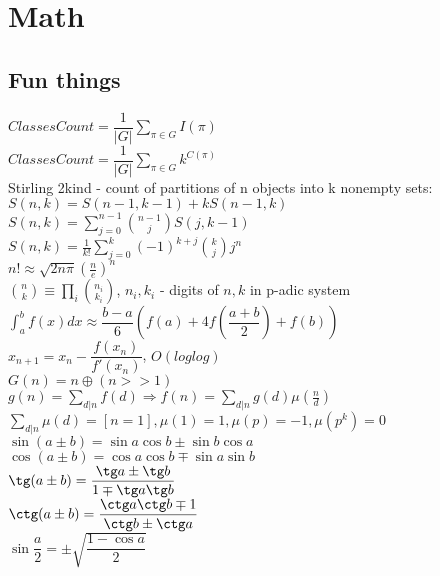 \chapter{Math}

{}
{}
{}
\columnbreak
\section{Fun things}
$ClassesCount = \dfrac{1}{|G|} \sum_{\pi \in G} I(\pi)$\\
$ClassesCount = \dfrac{1}{|G|} \sum_{\pi \in G} k^{C(\pi)}$\\
Stirling 2kind - count of partitions of n objects into k nonempty sets:\\
$S(n,k) = S(n-1,k-1) + kS(n-1,k)$\\
$S(n,k) = \sum_{j=0}^{n-1} \binom{n-1}{j}S(j,k-1)$\\
$S(n,k) = \frac{1}{k!}\sum_{j=0}^k(-1)^{k+j}\binom{k}{j}j^n$\\
$n! \approx \sqrt{2n\pi}(\frac{n}{e})^n$\\
$\binom{n}{k} \equiv \prod_{i}\binom{n_i}{k_i}$, $n_i, k_i$ - digits of $n,k$ in p-adic system
$\int_{a}^{b}f(x)dx \approx \dfrac{b-a}{6}(f(a) + 4f(\dfrac{a+b}
{2})+f(b))$\\
$x_{n+1} = x_n - \dfrac{f(x_n)}{f'(x_n)}$, $O(loglog)$\\
$G(n) = n \oplus (n >> 1)$\\
$g(n) = \sum_{d|n} f(d) \Rightarrow f(n) = \sum_{d|n} g(d) \mu(\frac{n}{d})$\\
$\sum_{d|n} \mu(d) = [n = 1],   \mu(1) = 1, \mu(p) = -1, \mu(p^k) = 0$\\
$\sin(a \pm b) = \sin a \cos b \pm \sin b \cos a$\\
$\cos(a \pm b) = \cos a \cos b \mp \sin a \sin b$\\
$\tg(a\pm b) = \dfrac{\tg a \pm \tg b}{1 \mp \tg a \tg b}$\\
$\ctg(a \pm b) = \dfrac{\ctg a \ctg b \mp 1}{\ctg b \pm \ctg a}$\\
$\sin \dfrac{a}{2} = \pm \sqrt{\dfrac{1-\cos a}{2}}$\\
